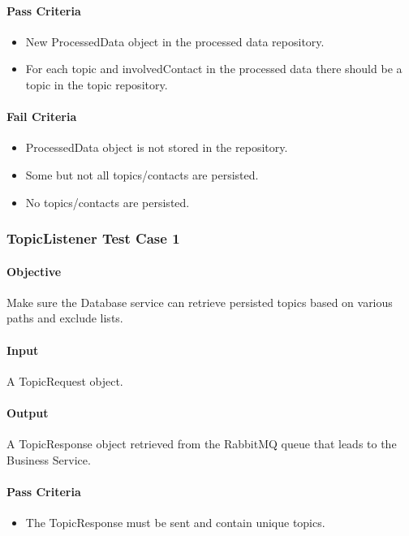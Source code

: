 \documentclass[hidelinks,english]{article}
\begin{document}
				\paragraph{Pass Criteria}
				\begin{itemize}
					\item New ProcessedData object in the processed data repository.
					\item For each topic and involvedContact in the processed data there should be a topic in the topic repository.
				\end{itemize}
				\paragraph{Fail Criteria}
				\begin{itemize}
					\item ProcessedData object is not stored in the repository.
					\item Some but not all topics/contacts are persisted.
					\item No topics/contacts are persisted.
				\end{itemize}
				
			\subsubsection{TopicListener Test Case 1}\label{databasetopiclistenertest1}
				\paragraph{Objective} Make sure the Database service can retrieve persisted topics based on various paths and exclude lists.
				\paragraph{Input} A TopicRequest object.
				\paragraph{Output} A TopicResponse object retrieved from the RabbitMQ queue that leads to the Business Service.
				\paragraph{Pass Criteria}
				\begin{itemize}
					\item The TopicResponse must be sent and contain unique topics.
				\end{itemize}
\end{document}
